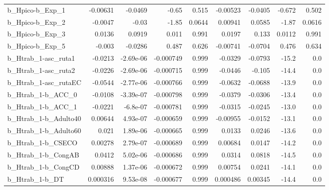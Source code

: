 \begin{tabular}{lrrrrrrrr}
b\_Hpico-b\_Exp\_1            &    -0.00631 &      -0.0469 &     -0.65 &    0.515 &   -0.00523 &     -0.0405 &       -0.672 &         0.502 \\
b\_Hpico-b\_Exp\_2            &     -0.0047 &        -0.03 &     -1.85 &   0.0644 &    0.00941 &      0.0585 &        -1.87 &        0.0616 \\
b\_Hpico-b\_Exp\_3            &      0.0136 &       0.0919 &     0.011 &    0.991 &     0.0197 &       0.133 &       0.0112 &         0.991 \\
b\_Hpico-b\_Exp\_5            &      -0.003 &      -0.0286 &     0.487 &    0.626 &   -0.00741 &     -0.0704 &        0.476 &         0.634 \\
b\_Htrab\_1-asc\_ruta1        &     -0.0213 &    -2.69e-06 & -0.000749 &    0.999 &    -0.0329 &     -0.0793 &        -15.2 &           0.0 \\
b\_Htrab\_1-asc\_ruta2        &     -0.0226 &    -2.69e-06 & -0.000715 &    0.999 &    -0.0446 &      -0.105 &        -14.4 &           0.0 \\
b\_Htrab\_1-asc\_rutaEC       &     -0.0544 &    -2.77e-06 & -0.000766 &    0.999 &    -0.0632 &     -0.0688 &        -13.9 &           0.0 \\
b\_Htrab\_1-b\_ACC\_0          &     -0.0108 &    -3.39e-07 & -0.000798 &    0.999 &    -0.0379 &     -0.0306 &        -13.4 &           0.0 \\
b\_Htrab\_1-b\_ACC\_1          &     -0.0221 &     -6.8e-07 & -0.000781 &    0.999 &    -0.0315 &     -0.0245 &        -13.0 &           0.0 \\
b\_Htrab\_1-b\_Adulto40       &     0.00644 &     4.93e-07 & -0.000659 &    0.999 &   -0.00955 &     -0.0152 &        -13.1 &           0.0 \\
b\_Htrab\_1-b\_Adulto60       &       0.021 &     1.89e-06 & -0.000665 &    0.999 &     0.0133 &      0.0246 &        -13.6 &           0.0 \\
b\_Htrab\_1-b\_CSECO          &     0.00278 &     2.79e-07 & -0.000689 &    0.999 &    0.00684 &      0.0147 &        -14.2 &           0.0 \\
b\_Htrab\_1-b\_CongAB         &      0.0412 &     5.02e-06 & -0.000686 &    0.999 &     0.0314 &      0.0818 &        -14.5 &           0.0 \\
b\_Htrab\_1-b\_CongCD         &     0.00888 &     1.37e-06 & -0.000672 &    0.999 &    0.00754 &      0.0241 &        -14.1 &           0.0 \\
b\_Htrab\_1-b\_DT             &    0.000316 &     9.53e-08 & -0.000677 &    0.999 &   0.000486 &     0.00345 &        -14.4 &           0.0 \\

\end{tabular}
